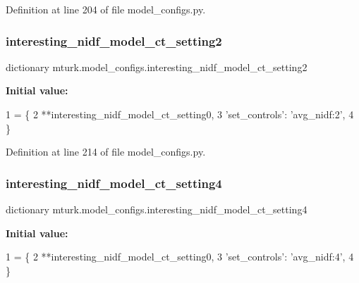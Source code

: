 Definition at line 204 of file model\+\_\+configs.\+py.

\mbox{\label{namespacemturk_1_1model__configs_acbf605fec76321449d7cd6d0ce5ea2ec}} 
\subsubsection{\texorpdfstring{interesting\+\_\+nidf\+\_\+model\+\_\+ct\+\_\+setting2}{interesting\_nidf\_model\_ct\_setting2}}
{\footnotesize\ttfamily dictionary mturk.\+model\+\_\+configs.\+interesting\+\_\+nidf\+\_\+model\+\_\+ct\+\_\+setting2}

{\bfseries Initial value\+:}
\begin{DoxyCode}
1 =  \{
2     **interesting\_nidf\_model\_ct\_setting0,
3     \textcolor{stringliteral}{'set\_controls'}: \textcolor{stringliteral}{'avg\_nidf:2'},
4 \}
\end{DoxyCode}


Definition at line 214 of file model\+\_\+configs.\+py.

\mbox{\label{namespacemturk_1_1model__configs_a2f72f4d5fee474c4b69999d86d60b915}} 
\subsubsection{\texorpdfstring{interesting\+\_\+nidf\+\_\+model\+\_\+ct\+\_\+setting4}{interesting\_nidf\_model\_ct\_setting4}}
{\footnotesize\ttfamily dictionary mturk.\+model\+\_\+configs.\+interesting\+\_\+nidf\+\_\+model\+\_\+ct\+\_\+setting4}

{\bfseries Initial value\+:}
\begin{DoxyCode}
1 =  \{
2     **interesting\_nidf\_model\_ct\_setting0,
3     \textcolor{stringliteral}{'set\_controls'}: \textcolor{stringliteral}{'avg\_nidf:4'},
4 \}
\end{DoxyCode}


